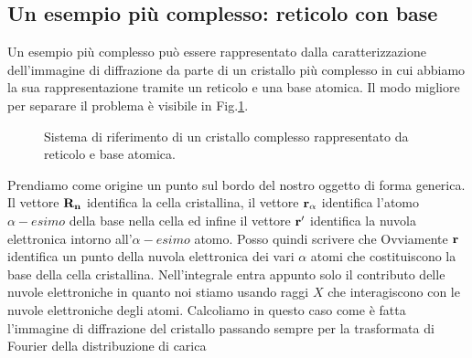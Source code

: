 \documentclass[a4paper,12pt]{article}
\begin{document}
\subsection{Un esempio più complesso: reticolo con base}
Un esempio più complesso può essere rappresentato dalla caratterizzazione dell'immagine di diffrazione da parte di un cristallo più complesso in cui abbiamo la sua rappresentazione tramite un reticolo e una base atomica. Il modo migliore per separare il problema è visibile in Fig.\ref{base:laue}.
\begin{figure}
	\centering
	\caption{Sistema di riferimento di un cristallo complesso rappresentato da reticolo e base atomica.}
	\label{base:laue}
\end{figure}
Prendiamo come origine un punto sul bordo del nostro oggetto di forma generica. Il vettore $\it\bf{R}_n$ identifica la cella cristallina, il vettore $\it\bf{r}_\alpha$ identifica l'atomo $\alpha-esimo$ della base nella cella ed infine il vettore $\it\bf{r'}$ identifica la nuvola elettronica intorno all'$\alpha-esimo$ atomo. Posso quindi scrivere che
 Ovviamente $\it\bf{r}$ identifica un punto della nuvola elettronica dei vari $\alpha$ atomi che costituiscono la base della cella cristallina. Nell'integrale entra appunto solo il contributo delle nuvole elettroniche in quanto noi stiamo usando raggi $X$ che interagiscono con le nuvole elettroniche degli atomi. Calcoliamo in questo caso come è fatta l'immagine di diffrazione del cristallo passando sempre per la trasformata di Fourier della distribuzione di carica
\end{document}

